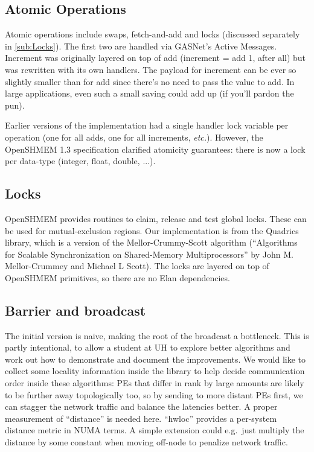 \documentclass[english]{article}
\newcommand{\openshmem} {\mbox{OpenSHMEM}\xspace}
\begin{document}
\subsection{Atomic Operations}

Atomic operations include swaps, fetch-and-add and locks (discussed
separately in \ref{sub:Locks}). The first two are handled via GASNet's
Active Messages. Increment was originally layered on top of add
(increment = add 1, after all) but was rewritten with its own
handlers. The payload for increment can be ever so slightly smaller
than for add since there's no need to pass the value to add. In large
applications, even such a small saving could add up (if you'll pardon
the pun).

Earlier versions of the implementation had a single handler lock
variable per operation (one for all adds, one for all increments,
\emph{etc.}).
However, the \openshmem 1.3 specification clarified atomicity
guarantees: there is now a lock per data-type (integer, float, double,
...).

\subsection{\label{sub:Locks}Locks}

\openshmem provides routines to claim, release and test global locks.
These can be used for mutual-exclusion regions. Our implementation is
from the Quadrics library, which is a version of the
Mellor-Crummy-Scott algorithm (``Algorithms for Scalable
Synchronization on Shared-Memory Multiprocessors'' by John
M. Mellor-Crummey and Michael L Scott).  The locks are layered on top
of \openshmem primitives, so there are no Elan dependencies.

\subsection{Barrier and broadcast}

The initial version is naive, making the root of the broadcast a
bottleneck.  This is partly intentional, to allow a student at UH to
explore better algorithms and work out how to demonstrate and document
the improvements. We would like to collect some locality information
inside the library to help decide communication order inside these
algorithms: PEs that differ in rank by large amounts are likely to be
further away topologically too, so by sending to more distant PEs
first, we can stagger the network traffic and balance the latencies
better. A proper measurement of ``distance'' is needed here. ``hwloc''
provides a per-system distance metric in NUMA terms. A simple
extension could e.g.\ just multiply the distance by some constant when
moving off-node to penalize network traffic.
\end{document}
